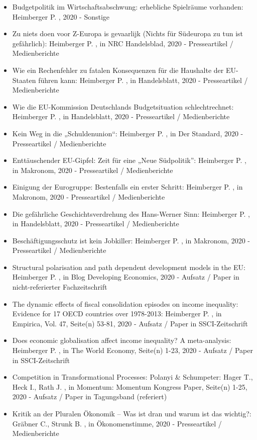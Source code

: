 \begin{itemize}
	 \item Budgetpolitik im Wirtschaftsabschwung: erhebliche Spielräume vorhanden: Heimberger P. , 2020 - Sonstige
	 \item Zu niets doen voor Z-Europa is gevaarlijk (Nichts für Südeuropa zu tun ist gefährlich): Heimberger P. , in NRC Handelsblad, 2020 - Presseartikel / Medienberichte
	 \item Wie ein Rechenfehler zu fatalen Konsequenzen für die Haushalte der EU-Staaten führen kann: Heimberger P. , in Handelsblatt, 2020 - Presseartikel / Medienberichte
	 \item Wie die EU-Kommission Deutschlands Budgetsituation schlechtrechnet: Heimberger P. , in Handelsblatt, 2020 - Presseartikel / Medienberichte
	 \item Kein Weg in die „Schuldenunion“: Heimberger P. , in Der Standard, 2020 - Presseartikel / Medienberichte
	 \item Enttäuschender EU-Gipfel: Zeit für eine „Neue Südpolitik”: Heimberger P. , in Makronom, 2020 - Presseartikel / Medienberichte
	 \item Einigung der Eurogruppe: Bestenfalls ein erster Schritt: Heimberger P. , in Makronom, 2020 - Presseartikel / Medienberichte
	 \item Die gefährliche Geschichtsverdrehung des Hans-Werner Sinn: Heimberger P. , in Handelsblatt, 2020 - Presseartikel / Medienberichte
	 \item Beschäftigungsschutz ist kein Jobkiller: Heimberger P. , in Makronom, 2020 - Presseartikel / Medienberichte
	 \item Structural polarisation and path dependent development models in the EU: Heimberger P. , in Blog Developing Economics, 2020 - Aufsatz / Paper in nicht-referierter Fachzeitschrift
	 \item The dynamic effects of fiscal consolidation episodes on income inequality: Evidence for 17 OECD countries over 1978-2013: Heimberger P. , in Empirica, Vol. 47, Seite(n) 53-81, 2020 - Aufsatz / Paper in SSCI-Zeitschrift
	 \item Does economic globalisation affect income inequality? A meta-analysis: Heimberger P. , in The World Economy, Seite(n) 1-23, 2020 - Aufsatz / Paper in SSCI-Zeitschrift
	 \item Competition in Transformational Processes: Polanyi & Schumpeter: Hager T., Heck I., Rath J. , in Momentum: Momentum Kongress Paper, Seite(n) 1-25, 2020 - Aufsatz / Paper in Tagungsband (referiert)
	 \item Kritik an der Pluralen Ökonomik – Was ist dran und warum ist das wichtig?: Gräbner C., Strunk B. , in Ökonomenstimme, 2020 - Presseartikel / Medienberichte

\end{itemize}
